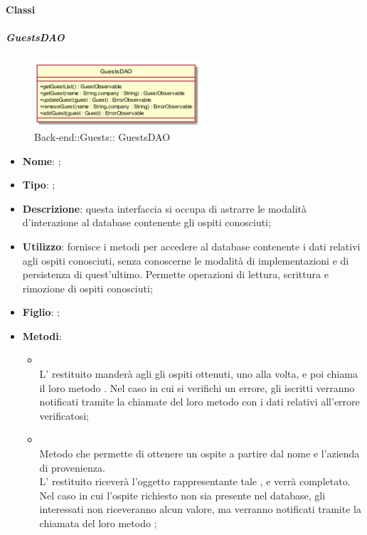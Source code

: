\paragraph{Classi}
\hypertarget{ GuestsDAO_label}{\subparagraph{ GuestsDAO}}
\begin{figure}[h]
	\centering
	\includegraphics[width=0.55\textwidth,height=\textheight,keepaspectratio]{images/ClassGuestsDAO.png}
	\caption{Back-end::Guests:: GuestsDAO}
\end{figure}
\begin{itemize}
	\item \textbf{Nome}: ;
	\item \textbf{Tipo}: ;
	\item \textbf{Descrizione}: questa interfaccia si occupa di astrarre le modalità d'interazione al database contenente gli ospiti conosciuti;
	\item \textbf{Utilizzo}: fornisce i metodi per accedere al database contenente i dati relativi agli ospiti conosciuti, senza conoscerne le modalità di implementazioni e di persistenza di quest'ultimo. Permette operazioni di lettura, scrittura e rimozione di ospiti conosciuti;
	\item \textbf{Figlio}: ;
	\item \textbf{Metodi}:
	\begin{itemize}
		\item[]  \\		L' restituito manderà agli  gli ospiti ottenuti, uno alla volta, e poi chiama il loro metodo . Nel caso in cui si verifichi un errore, gli  iscritti verranno notificati tramite la chiamate del loro metodo  con i dati relativi all'errore verificatosi;\\
		\item[]  \\		Metodo che permette di ottenere un ospite a partire dal nome e l'azienda di provenienza. \\
L' restituito riceverà l'oggetto rappresentante tale , e verrà completato. Nel caso in cui l'ospite richiesto non sia presente nel database, gli  interessati non riceveranno alcun valore, ma verranno notificati tramite la chiamata del loro metodo ;\\

\end{itemize}
\end{itemize}

